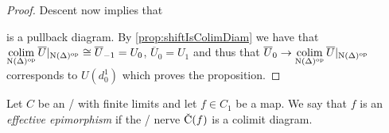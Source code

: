 \begin{prop}
\begin{proof}
        Descent now implies that 
        \begin{center}
        \end{center}
        is a pullback diagram.
        By \cref{prop:shiftIsColimDiam} we have that $\operatorname*{colim}\limits_{\operatorname{N}(\Delta)^{\operatorname{op}}}\overline{U}|_{\operatorname{N}(\Delta)^{\operatorname{op}}}\cong\overline{U}_{-1} = U_0$, $\overline{U}_0=U_1$ and thus that $\overline{U}_{0}\to\operatorname*{colim}\limits_{\operatorname{N}(\Delta)^{\operatorname{op}}}\overline{U}|_{\operatorname{N}(\Delta)^{\operatorname{op}}}$ corresponds to $U(d_0^1)$ which proves the proposition.
    \end{proof}
\end{prop}
\begin{definition}
    Let $C$ be an \inftycat/ with finite limits and let $f\in C_1$ be a map.
    We say that $f$ is an \emph{effective epimorphism} if the \Cech/ nerve $\CN(f)$ is a colimit diagram.
\end{definition}
